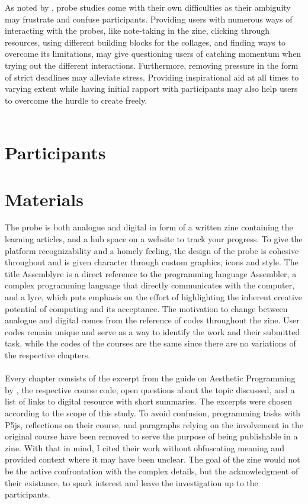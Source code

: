 As noted by \citeauthor{mattelmäki:2005}, probe studies come with their own difficulties as their ambiguity may frustrate and confuse participants. Providing users with numerous ways of interacting with the probes, like note-taking in the zine, clicking through resources, using different building blocks for the collages, and finding ways to overcome its limitations, may give questioning users of catching momentum when trying out the different interactions. Furthermore, removing pressure in the form of strict deadlines may alleviate stress. Providing inspirational aid at all times to varying extent while having initial rapport with participants may also help users to overcome the hurdle to create freely. \\ \\

\section{Participants}
\section{Materials}
The probe is both analogue and digital in form of a written zine containing the learning articles, and a hub space on a website to track your progress. To give the platform recognizability and a homely feeling, the design of the probe is cohesive throughout and is given character through custom graphics, icons and style. The title Assemblyre is a direct reference to the programming language Assembler, a complex programming language that directly communicates with the computer, and a lyre, which puts emphasis on the effort of highlighting the inherent creative potential of computing and its acceptance. The motivation to change between analogue and digital comes from the reference of codes throughout the zine. User codes remain unique and serve as a way to identify the work and their submitted task, while the codes of the courses are the same since there are no variations of the respective chapters. \\ \\
Every chapter consists of the excerpt from the guide on Aesthetic Programming by \cite{soon:2020}, the respective course code, open questions about the topic discussed, and a list of links to digital resource with short summaries. The excerpts were chosen according to the scope of this study. To avoid confusion, programming tasks with P5js, reflections on their course, and paragraphs relying on the involvement in the original course have been removed to serve the purpose of being publishable in a zine. With that in mind, I cited their work without obfuscating meaning and provided context where it may have been unclear. The goal of the zine would not be the active confrontation with the complex details, but the acknowledgment of their existance, to spark interest and leave the investigation up to the participants.
